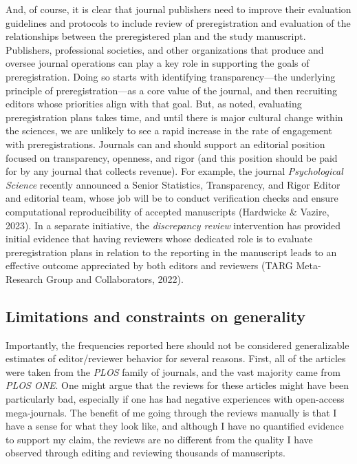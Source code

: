 \documentclass[authordate, meta]{jote-new-article}
\begin{document}
	And, of course, it is clear that journal publishers need to improve their evaluation guidelines and protocols to include review of preregistration and evaluation of the relationships between the preregistered plan and the study manuscript. Publishers, professional societies, and other organizations that produce and oversee journal operations can play a key role in supporting the goals of preregistration. Doing so starts with identifying transparency—the underlying principle of preregistration—as a core value of the journal, and then recruiting editors whose priorities align with that goal. But, as noted, evaluating preregistration plans takes time, and until there is major cultural change within the sciences, we are unlikely to see a rapid increase in the rate of engagement with preregistrations. Journals can and should support an editorial position focused on transparency, openness, and rigor (and this position should be paid for by any journal that collects revenue). For example, the journal \emph{Psychological Science} recently announced a Senior Statistics, Transparency, and Rigor Editor and editorial team, whose job will be to conduct verification checks and ensure computational reproducibility of accepted manuscripts (Hardwicke \& Vazire, 2023). In a separate initiative, the \emph{discrepancy review} intervention has provided initial evidence that having reviewers whose dedicated role is to evaluate preregistration plans in relation to the reporting in the manuscript leads to an effective outcome appreciated by both editors and reviewers (TARG Meta-Research Group and Collaborators, 2022).



	\subsection{Limitations and constraints on generality}



	Importantly, the frequencies reported here should not be considered generalizable estimates of editor/reviewer behavior for several reasons. First, all of the articles were taken from the \emph{PLOS} family of journals, and the vast majority came from \emph{PLOS ONE}. One might argue that the reviews for these articles might have been particularly bad, especially if one has had negative experiences with open-access mega-journals. The benefit of me going through the reviews manually is that I have a sense for what they look like, and although I have no quantified evidence to support my claim, the reviews are no different from the quality I have observed through editing and reviewing thousands of manuscripts.
\end{document}
